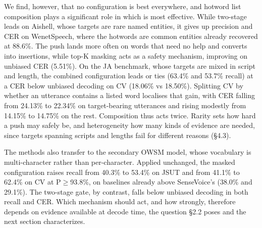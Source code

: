 \documentclass{article}
\begin{document}
We find, however, that no configuration is best everywhere, and hotword list composition plays a significant role in which is most effective. While two-stage leads on Aishell, whose targets are rare named entities, it gives up precision and CER on WenetSpeech, where the hotwords are common entities already recovered at 88.6\%. The push lands more often on words that need no help and converts into insertions, while top-K masking acts as a safety mechanism, improving on unbiased CER (5.51\%). On the JA benchmark, whose targets are mixed in script and length, the combined configuration leads or ties (63.4\% and 53.7\% recall) at a CER below unbiased decoding on CV (18.06\% vs 18.50\%). Splitting CV by whether an utterance contains a listed word localises that gain, with CER falling from 24.13\% to 22.34\% on target-bearing utterances and rising modestly from 14.15\% to 14.75\% on the rest. Composition thus acts twice. Rarity sets how hard a push may safely be, and heterogeneity how many kinds of evidence are needed, since targets spanning scripts and lengths fail for different reasons (§4.3).

The methods also transfer to the secondary OWSM model, whose vocabulary is multi-character rather than per-character. Applied unchanged, the masked configuration raises recall from 40.3\% to 53.4\% on JSUT and from 41.1\% to 62.4\% on CV at P$\geq$93.8\%, on baselines already above SenseVoice's (38.0\% and 29.1\%). The two-stage gate, by contrast, falls below unbiased decoding in both recall and CER. Which mechanism should act, and how strongly, therefore depends on evidence available at decode time, the question §2.2 poses and the next section characterizes.



\end{document}
